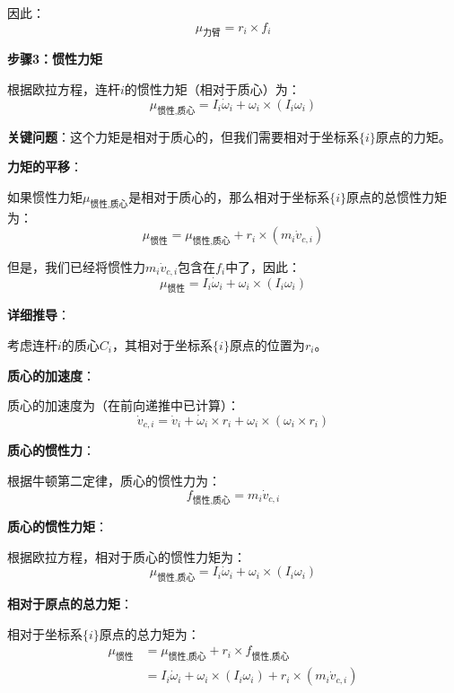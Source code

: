 \documentclass[12pt,a4paper]{article}
\begin{document}
因此：
\begin{equation}
\mu_{\text{力臂}} = r_i \times f_i
\end{equation}

\textbf{步骤3：惯性力矩}

根据欧拉方程，连杆$i$的惯性力矩（相对于质心）为：
\begin{equation}
\mu_{\text{惯性,质心}} = I_i \dot{\omega}_i + \omega_i \times (I_i \omega_i)
\end{equation}

\textbf{关键问题}：这个力矩是相对于质心的，但我们需要相对于坐标系$\{i\}$原点的力矩。

\textbf{力矩的平移}：

如果惯性力矩$\mu_{\text{惯性,质心}}$是相对于质心的，那么相对于坐标系$\{i\}$原点的总惯性力矩为：
\begin{equation}
\mu_{\text{惯性}} = \mu_{\text{惯性,质心}} + r_i \times (m_i \dot{v}_{c,i})
\end{equation}

但是，我们已经将惯性力$m_i \dot{v}_{c,i}$包含在$f_i$中了，因此：
\begin{equation}
\mu_{\text{惯性}} = I_i \dot{\omega}_i + \omega_i \times (I_i \omega_i)
\end{equation}

\textbf{详细推导}：

考虑连杆$i$的质心$C_i$，其相对于坐标系$\{i\}$原点的位置为$r_i$。

\textbf{质心的加速度}：

质心的加速度为（在前向递推中已计算）：
\begin{equation}
\dot{v}_{c,i} = \dot{v}_i + \dot{\omega}_i \times r_i + \omega_i \times (\omega_i \times r_i)
\end{equation}

\textbf{质心的惯性力}：

根据牛顿第二定律，质心的惯性力为：
\begin{equation}
f_{\text{惯性,质心}} = m_i \dot{v}_{c,i}
\end{equation}

\textbf{质心的惯性力矩}：

根据欧拉方程，相对于质心的惯性力矩为：
\begin{equation}
\mu_{\text{惯性,质心}} = I_i \dot{\omega}_i + \omega_i \times (I_i \omega_i)
\end{equation}

\textbf{相对于原点的总力矩}：

相对于坐标系$\{i\}$原点的总力矩为：
\begin{align}
\mu_{\text{惯性}} &= \mu_{\text{惯性,质心}} + r_i \times f_{\text{惯性,质心}} \\
&= I_i \dot{\omega}_i + \omega_i \times (I_i \omega_i) + r_i \times (m_i \dot{v}_{c,i})
\end{align}
\end{document}
